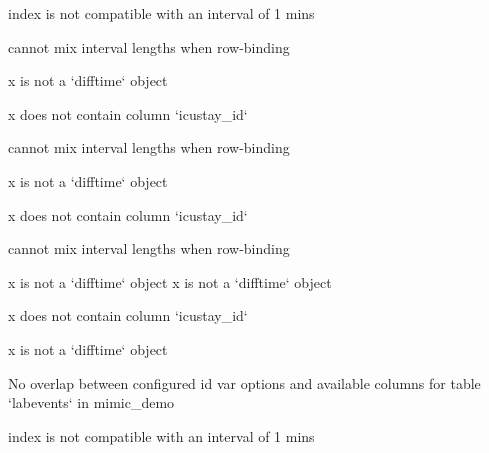 \documentclass[
]{jss}
\begin{document}
\begin{CodeChunk}
\begin{CodeOutput}
index is not compatible with an interval of 1 mins
\end{CodeOutput}

\begin{CodeOutput}
cannot mix interval lengths when row-binding
\end{CodeOutput}

\begin{CodeOutput}
x is not a `difftime` object
\end{CodeOutput}

\begin{CodeOutput}
x does not contain column `icustay_id`
\end{CodeOutput}

\begin{CodeOutput}
cannot mix interval lengths when row-binding
\end{CodeOutput}

\begin{CodeOutput}
x is not a `difftime` object
\end{CodeOutput}

\begin{CodeOutput}
x does not contain column `icustay_id`
\end{CodeOutput}

\begin{CodeOutput}
cannot mix interval lengths when row-binding
\end{CodeOutput}

\begin{CodeOutput}
x is not a `difftime` object
x is not a `difftime` object
\end{CodeOutput}

\begin{CodeOutput}
x does not contain column `icustay_id`
\end{CodeOutput}

\begin{CodeOutput}
x is not a `difftime` object
\end{CodeOutput}

\begin{CodeOutput}
No overlap between configured id var options and available columns for table
`labevents` in mimic_demo
\end{CodeOutput}

\begin{CodeOutput}
index is not compatible with an interval of 1 mins
\end{CodeOutput}


\end{CodeChunk}
\end{document}
